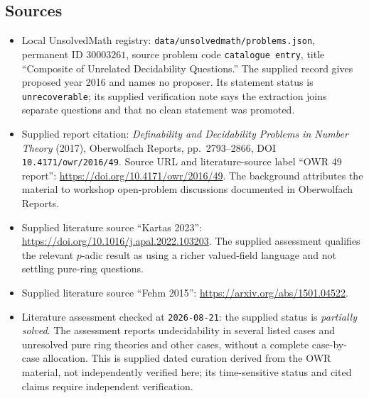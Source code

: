 \documentclass[11pt]{article}
\begin{document}
\subsection{Sources}
\begin{itemize}
\item Local UnsolvedMath registry: \texttt{data/unsolvedmath/problems.json}, permanent ID \(30003261\), source problem code \texttt{catalogue entry}, title ``Composite of Unrelated Decidability Questions.'' The supplied record gives proposed year 2016 and names no proposer. Its statement status is \texttt{unrecoverable}; its supplied verification note says the extraction joins separate questions and that no clean statement was promoted.
\item Supplied report citation: \emph{Definability and Decidability Problems in Number Theory} (2017), Oberwolfach Reports, pp.\ 2793--2866, DOI \texttt{10.4171/owr/2016/49}. Source URL and literature-source label ``OWR 49 report'': \url{https://doi.org/10.4171/owr/2016/49}. The background attributes the material to workshop open-problem discussions documented in Oberwolfach Reports.
\item Supplied literature source ``Kartas 2023'': \url{https://doi.org/10.1016/j.apal.2022.103203}. The supplied assessment qualifies the relevant \(p\)-adic result as using a richer valued-field language and not settling pure-ring questions.
\item Supplied literature source ``Fehm 2015'': \url{https://arxiv.org/abs/1501.04522}.
\item Literature assessment checked at \texttt{2026-08-21}: the supplied status is \emph{partially solved}. The assessment reports undecidability in several listed cases and unresolved pure ring theories and other cases, without a complete case-by-case allocation. This is supplied dated curation derived from the OWR material, not independently verified here; its time-sensitive status and cited claims require independent verification.
\end{itemize}
\end{document}
